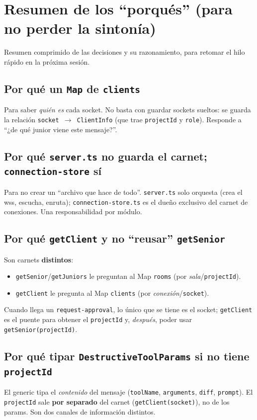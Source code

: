 \documentclass[11pt,a4paper]{article}
\begin{document}
\section{Resumen de los ``porqués'' (para no perder la sintonía)}

Resumen comprimido de las decisiones y su razonamiento, para retomar el hilo
rápido en la próxima sesión.

\subsection{Por qué un \texttt{Map} de \texttt{clients}}
Para saber \emph{quién es} cada socket. No basta con guardar sockets sueltos:
se guarda la relación \texttt{socket $\rightarrow$ ClientInfo} (que trae
\texttt{projectId} y \texttt{role}). Responde a ``¿de qué junior viene este
mensaje?''.

\subsection{Por qué \texttt{server.ts} no guarda el carnet; \texttt{connection-store} sí}
Para no crear un ``archivo que hace de todo''. \texttt{server.ts} solo
orquesta (crea el wss, escucha, enruta); \texttt{connection-store.ts} es el
dueño exclusivo del carnet de conexiones. Una responsabilidad por módulo.

\subsection{Por qué \texttt{getClient} y no ``reusar'' \texttt{getSenior}}
Son carnets \textbf{distintos}:
\begin{itemize}
  \item \texttt{getSenior}/\texttt{getJuniors} le preguntan al Map
        \texttt{rooms} (por \emph{sala}/\texttt{projectId}).
  \item \texttt{getClient} le pregunta al Map \texttt{clients} (por
        \emph{conexión}/\texttt{socket}).
\end{itemize}
Cuando llega un \texttt{request-approval}, lo \'unico que se tiene es el
socket; \texttt{getClient} es el puente para obtener el \texttt{projectId} y,
\emph{después}, poder usar \texttt{getSenior(projectId)}.

\subsection{Por qué tipar \texttt{DestructiveToolParams} si no tiene \texttt{projectId}}
El generic tipa el \emph{contenido} del mensaje (\texttt{toolName},
\texttt{arguments}, \texttt{diff}, \texttt{prompt}). El \texttt{projectId} sale
\textbf{por separado} del carnet (\texttt{getClient(socket)}), no de los
params. Son dos canales de información distintos.
\end{document}
